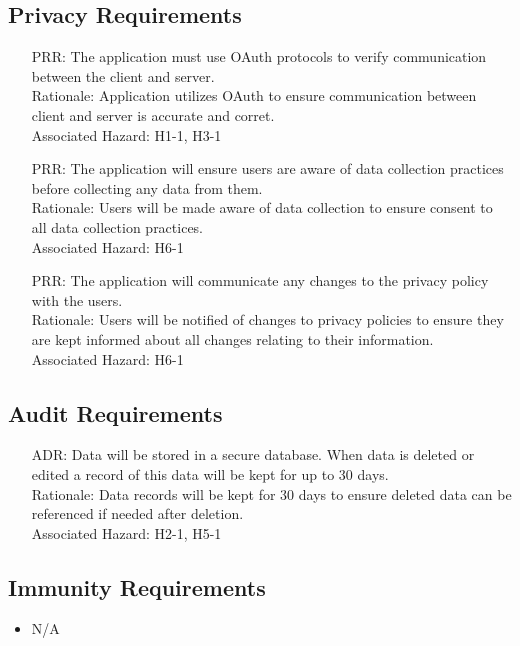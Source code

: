 \documentclass{article}
\newcounter{PRRnum}
\newcounter{ADRnum}
\begin{document}
	\subsection{Privacy Requirements}
	\noindent 
	\begin{itemize}
		\item[PRR\refstepcounter{PRRnum}\thePRRnum:]
		The application must use OAuth protocols to verify communication between the client and server.
		\\Rationale: Application utilizes OAuth to ensure communication between client and server is accurate and corret.
		\\Associated Hazard: H1-1, H3-1
		\item[PRR\refstepcounter{PRRnum}\thePRRnum:]
		The application will ensure users are aware of data collection practices before collecting any data from them.
		\\Rationale: Users will be made aware of data collection to ensure consent to all data collection practices.
		\\Associated Hazard: H6-1
		\item[PRR\refstepcounter{PRRnum}\thePRRnum:]
		The application will communicate any changes to the privacy policy with the users.	
		\\Rationale: Users will be notified of changes to privacy policies to ensure they are kept informed about all changes relating to their information.
		\\Associated Hazard: H6-1
	\end{itemize}
	\subsection{Audit Requirements}
	\noindent
	\begin{itemize}
		\item[ADR\refstepcounter{ADRnum}\theADRnum:]
		Data will be stored in a secure database. When data is deleted or edited a record of this data will be kept for up to 30 days.
		\\Rationale: Data records will be kept for 30 days to ensure deleted data can be referenced if needed after deletion.
		\\Associated Hazard: H2-1, H5-1
	\end{itemize}
	\subsection{Immunity Requirements}
	\noindent 
	\begin{itemize}
		\item N/A
	\end{itemize}
	\newpage
	
\end{document}
